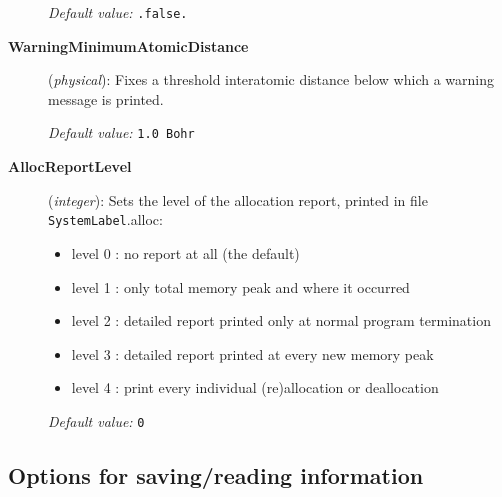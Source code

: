 \documentclass[11pt]{article}
\begin{document}
\begin{description}
{\it Default value:} {\tt .false.}

\item[{\bf WarningMinimumAtomicDistance}] ({\it physical}): 
Fixes a threshold interatomic distance below which a warning
message is printed.

{\it Default value:} {\tt 1.0 Bohr}

        
\item[{\bf AllocReportLevel}] ({\it integer}): 
Sets the level of the allocation report, printed in file 
{\tt SystemLabel}.alloc:
\begin{itemize}
\item
  level 0 : no report at all (the default)
\item
  level 1 : only total memory peak and where it occurred
\item
  level 2 : detailed report printed only at 
            normal program termination
\item
  level 3 : detailed report printed at every new memory peak
\item
  level 4 : print every individual (re)allocation or deallocation
\end{itemize}

{\it Default value:} {\tt 0}

\end{description}



\vspace{5pt}
\subsection{Options for saving/reading information}
\end{document}
